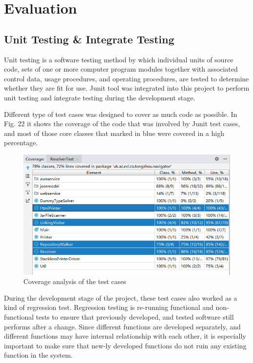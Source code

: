 \documentclass[runningheads]{llncs}
\begin{document}
\section{Evaluation}

\subsection{Unit Testing \& Integrate Testing}

Unit testing is a software testing method by which individual units of source code, sets of one or more computer program modules together with associated control data, usage procedures, and operating procedures, are tested to determine whether they are fit for use.\cite{huizinga2007automated} Junit tool was integrated into this project to perform unit testing and integrate testing during the development stage.

Different type of test cases was designed to cover as much code as possible. In Fig. 22 it shows the coverage of the code that was involved by Junit test cases, and most of those core classes that marked in blue were covered in a high percentage.

\begin{figure}[H]
	\centering
	\includegraphics[width=12cm]{pic/unit-test-coverage.png}
	\caption{Coverage analysis of the test cases}
	\label{Coverage analysis of the test cases}
\end{figure}

During the development stage of the project, these test cases also worked as a kind of regression test. Regression testing is re-running functional and non-functional tests to ensure that previously developed, and tested software still performs after a change.\cite{basu2015software} Since different functions are developed separately, and different functions may have internal relationship with each other, it is especially important to make sure that new-ly developed functions do not ruin any existing function in the system.
\end{document}
